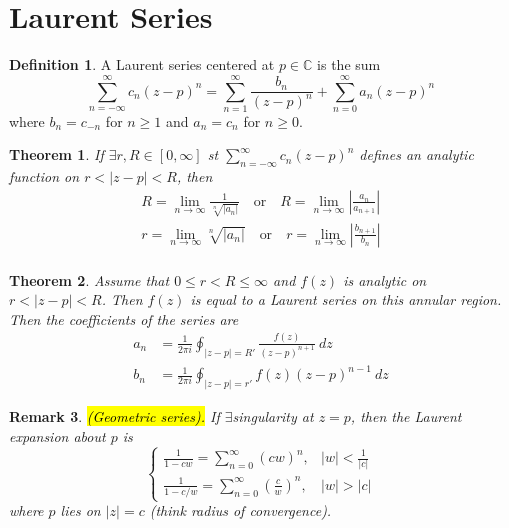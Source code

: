 \documentclass{article}
\newtheorem{theorem}{Theorem}[section]
\newtheorem{remark}[theorem]{Remark}
\theoremstyle{definition}
\newtheorem{definition}{Definition}[section]
\begin{document}
\section{Laurent Series}

\begin{definition}
    A Laurent series centered at $p \in \mathbb{C}$ is the sum
    \begin{equation*}
        \sum_{n=-\infty}^\infty c_n (z-p)^n = \sum_{n=1}^\infty \frac{b_n}{(z-p)^n} + \sum_{n=0}^\infty a_n (z-p)^n
    \end{equation*}
    where $b_n = c_{-n}$ for $n \geq 1$ and $a_n = c_n$ for $n \geq 0$.
\end{definition}

\begin{theorem}
    If $\exists r, R \in [0, \infty]$ st $\sum_{n=-\infty}^\infty c_n (z-p)^n$ defines an analytic function on $r < |z-p| < R$, then
    \begin{align*}
        R = \lim_{n \to \infty} \frac{1}{\sqrt[n]{|a_n|}} \quad \text{or} \quad R = \lim_{n \to \infty} \left| \frac{a_n}{a_{n+1}} \right| \\
        r = \lim_{n \to \infty} \sqrt[n]{|a_n|} \quad \text{or} \quad r = \lim_{n \to \infty} \left| \frac{b_{n+1}}{b_n} \right| \\
    \end{align*}
\end{theorem}

\begin{theorem}
    Assume that $0 \leq r < R \leq \infty$ and $f(z)$ is analytic on $r < |z-p| < R$. Then $f(z)$ is equal to a Laurent series on this annular region. Then the coefficients of the series are
    \begin{align*}
        a_n &= \frac{1}{2 \pi i} \oint_{|z-p| = R'} \frac{f(z)}{(z-p)^{n+1}}\ dz \\
        b_n &= \frac{1}{2 \pi i} \oint_{|z-p| = r'} f(z) (z-p)^{n-1}\ dz
    \end{align*}
\end{theorem}

\begin{remark}
    \hl{(Geometric series).} If $\exists$singularity at $z=p$, then the Laurent expansion about $p$ is
    \begin{equation*}
        \begin{cases}
            \displaystyle \frac{1}{1-cw} = \sum_{n=0}^\infty (cw)^n, & |w| < \frac{1}{|c|} \\
            \displaystyle \frac{1}{1-c/w} = \sum_{n=0}^\infty \left( \frac{c}{w} \right)^n, & |w| > |c|
        \end{cases}
    \end{equation*}
    where $p$ lies on $|z| = c$ (think radius of convergence).
\end{remark}
\end{document}
